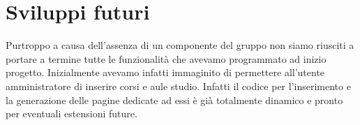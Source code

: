 \section{Sviluppi futuri}
Purtroppo a causa dell'assenza di un componente del gruppo non siamo riusciti a portare a termine tutte le funzionalità che avevamo programmato ad inizio progetto. Inizialmente avevamo infatti immaginito di permettere all'utente amministratore di inserire corsi e aule studio. Infatti il codice per l'inserimento e la generazione delle pagine dedicate ad essi è già totalmente dinamico e pronto per eventuali estensioni future.

